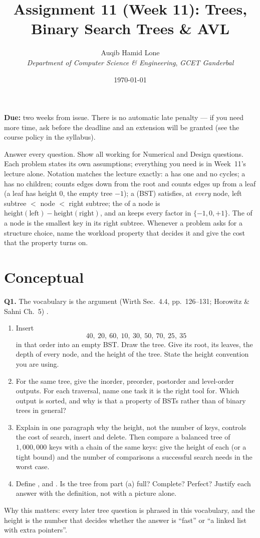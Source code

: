 \documentclass[11pt]{article}
\title{Assignment 11 (Week 11): Trees, Binary Search Trees \& AVL}
\author{Auqib Hamid Lone\\[0.3em]
  \emph{Department of Computer Science \& Engineering}, \emph{GCET Ganderbal}}
\date{\today}
\begin{document}
\maketitle

\noindent\textbf{Due:} two weeks from issue. There is no automatic late penalty --- if you need more time, ask before the deadline and an extension will be granted (see the course policy in the syllabus).

\noindent Answer every question. Show all working for Numerical and Design questions. Each problem states its own assumptions; everything you need is in Week~11's lecture alone. Notation matches the lecture exactly: a  has one  and no cycles; a  has no children;  counts edges down from the root and  counts edges up from a leaf (a leaf has height $0$, the empty tree $-1$); a  (BST) satisfies, at \emph{every} node, left subtree $<$ node $<$ right subtree; the  of a node is $\mathrm{height}(\text{left})-\mathrm{height}(\text{right})$, and an  keeps every factor in $\{-1,0,+1\}$. The  of a node is the smallest key in its right subtree. Whenever a problem asks for a structure choice, name the workload property that decides it and give the cost that the property turns on.

\section{Conceptual}

\textbf{Q1.} The vocabulary is the argument (Wirth Sec.~4.4, pp.~126--131; Horowitz \& Sahni Ch.~5) \cite{Wirth2004_algorithms_data_structures,HorowitzSahni2008_fundamentals_data_structures}.
\begin{enumerate}
  \item[(a)] Insert
  \[
    40,\ 20,\ 60,\ 10,\ 30,\ 50,\ 70,\ 25,\ 35
  \]
  in that order into an empty BST. Draw the tree. Give its root, its leaves, the depth of every node, and the height of the tree. State the height convention you are using.
  \item[(b)] For the same tree, give the inorder, preorder, postorder and level-order outputs. For each traversal, name one task it is the right tool for. Which output is sorted, and why is that a property of BSTs rather than of binary trees in general?
  \item[(c)] Explain in one paragraph why the height, not the number of keys, controls the cost of search, insert and delete. Then compare a balanced tree of $1{,}000{,}000$ keys with a chain of the same keys: give the height of each (or a tight bound) and the number of comparisons a successful search needs in the worst case.
  \item[(d)] Define ,  and . Is the tree from part (a) full? Complete? Perfect? Justify each answer with the definition, not with a picture alone.
\end{enumerate}
Why this matters: every later tree question is phrased in this vocabulary, and the height is the number that decides whether the answer is ``fast'' or ``a linked list with extra pointers''.
\end{document}
